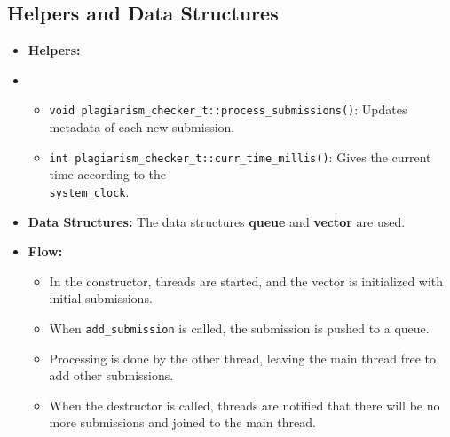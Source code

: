 \documentclass[11pt]{article}
\let\oldtexttt\texttt
\def\texttt#1{{\color{RoyalBlue}\oldtexttt{#1}}}
\begin{document}
\subsection{Helpers and Data Structures}
\begin{itemize}[noitemsep]
    \item \textbf{Helpers:}
    \item \begin{itemize}
        \item \texttt{void plagiarism\_checker\_t::process\_submissions()}:
        Updates metadata of each new submission.
        \item \texttt{int plagiarism\_checker\_t::curr\_time\_millis()}:
        Gives the current time according to the \\ \texttt{system\_clock}.
    \end{itemize}
    \item \textbf{Data Structures:} The data structures \textbf{queue} and \textbf{vector} are used.
    \item \textbf{Flow:} 
    \begin{itemize}
        \item In the constructor, threads are started, and the vector is initialized with initial submissions.
        \item When \texttt{add\_submission} is called, the submission is pushed to a queue.
        \item Processing is done by the other thread, leaving the main thread free to add other submissions.
        \item When the destructor is called, threads are notified that there will be no more submissions and joined to the main thread.
    \end{itemize}
\end{itemize}
\end{document}
